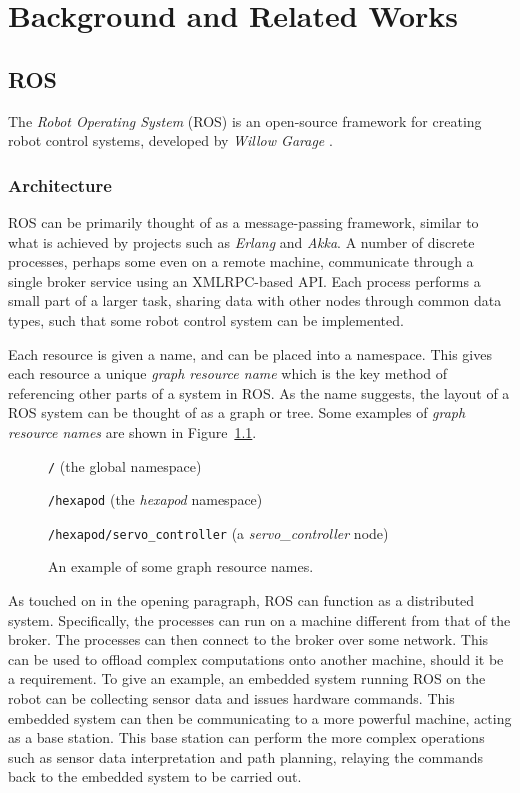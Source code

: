 \chapter{Background and Related Works}


\section{ROS}

The \emph{Robot Operating System} (ROS) is an open-source framework for creating robot control systems, developed by \emph{Willow Garage} \cite{ros_paper}.

\subsection{Architecture}
ROS can be primarily thought of as a message-passing framework, similar to what is achieved by projects such as \emph{Erlang} \cite{erlang} and \emph{Akka}. A number of discrete processes, perhaps some even on a remote machine, communicate through a single broker service using an XMLRPC-based API. Each process performs a small part of a larger task, sharing data with other nodes through common data types, such that some robot control system can be implemented.

Each resource is given a name, and can be placed into a namespace. This gives each resource a unique \emph{graph resource name} which is the key method of referencing other parts of a system in ROS. As the name suggests, the layout of a ROS system can be thought of as a graph or tree. Some examples of \emph{graph resource names} are shown in Figure~\ref{fig:graph_resource_names}.

\begin{figure}[h!]
    \centering

    \texttt{/} (the global namespace)

    \texttt{/hexapod} (the \emph{hexapod} namespace)

    \texttt{/hexapod/servo\_controller} (a \emph{servo\_controller} node)

    \caption{An example of some graph resource names.}
    \label{fig:graph_resource_names}
\end{figure}

As touched on in the opening paragraph, ROS can function as a distributed system. Specifically, the processes can run on a machine different from that of the broker. The processes can then connect to the broker over some network. This can be used to offload complex computations onto another machine, should it be a requirement. To give an example, an embedded system running ROS on the robot can be collecting sensor data and issues hardware commands. This embedded system can then be communicating to a more powerful machine, acting as a base station. This base station can perform the more complex operations such as sensor data interpretation and path planning, relaying the commands back to the embedded system to be carried out.


